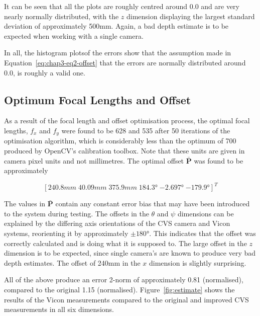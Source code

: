 It can be seen that all the plots are roughly centred around 0.0 and are very nearly normally distributed, with the $z$ dimension displaying the largest standard deviation of approximately 500mm. Again, a bad depth estimate is to be expected when working with a single camera.

In all, the histogram plotsof the errors show that the assumption made in Equation~\ref{eq:chap3-eq2-offset} that the errors are normally distributed around 0.0, is roughly a valid one. 

\subsection{Optimum Focal Lengths and Offset}

As a result of the focal length and offset optimisation process, the optimal focal lengths, $f_x$ and $f_y$ were found to be 628 and 535 after 50 iterations of the optimisation algorithm, which is considerably less than the optimum of 700 produced by OpenCV's calibration toolbox. Note that these units are given in camera pixel units and not millimetres. The optimal offset $\bar{\bm{P}}$ was found to be approximately

\[
  [240.8mm \; 40.09mm \; 375.9mm \; \ang{184.3} \; \ang{-2.697} \; \ang{-179.9}]^T
\]

The values in $\bar{\bm{P}}$ contain any constant error bias that may have been introduced to the system during testing. The offsets in the $\theta$ and $\psi$ dimensions can be explained by the differing axis orientations of the CVS camera and Vicon systems, reorienting it by approximately $\pm$$\ang{180}$. This indicates that the offset was correctly calculated and is doing what it is supposed to. The large offset in the $z$ dimension is to be expected, since single camera's are known to produce very bad depth estimates. The offset of 240mm in the $x$ dimension is slightly surprising. %

All of the above produce an error 2-norm of approximately 0.81 (normalised), compared to the original 1.15 (normalised). Figure~\ref{fig:estimate} shows the results of the Vicon measurements compared to the original and improved CVS measurements in all six dimensions.

